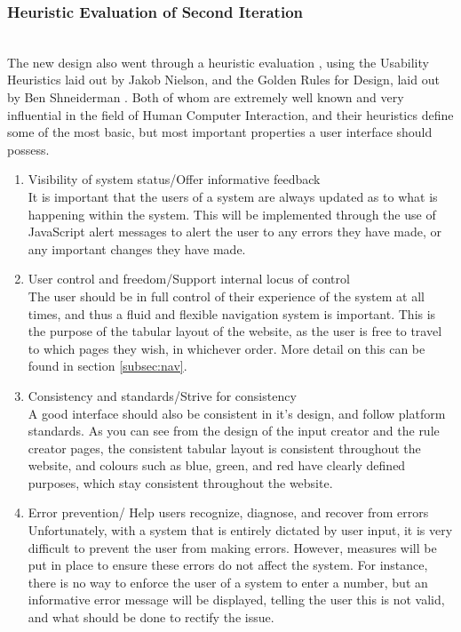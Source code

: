 \subsubsection{Heuristic Evaluation of Second Iteration}\ \\
The new design also went through a heuristic evaluation \cite{nielsen1990heuristic}, using the Usability Heuristics laid out by Jakob Nielson, and the Golden Rules for Design, laid out by Ben Shneiderman \cite{shneiderman2005designing}. Both of whom are extremely well known and very influential in the field of Human Computer Interaction, and their heuristics define some of the most basic, but most important properties a user interface should possess. 

\begin{enumerate}
\item Visibility of system status/Offer informative feedback\\
It is important that the users of a system are always updated as to what is happening within the system. This will be implemented through the use of JavaScript alert messages to alert the user to any errors they have made, or any important changes they have made.
\item User control and freedom/Support internal locus of control\\
The user should be in full control of their experience of the system at all times, and thus a fluid and flexible navigation system is important. This is the purpose of the tabular layout of the website, as the user is free to travel to which pages they wish, in whichever order. More detail on this can be found in section \ref{subsec:nav}.
\item Consistency and standards/Strive for consistency\\
A good interface should also be consistent in it's design, and follow platform standards. As you can see from the design of the input creator and the rule creator pages, the consistent tabular layout is consistent throughout the website, and colours such as blue, green, and red have clearly defined purposes, which stay consistent throughout the website.
\item Error prevention/ Help users recognize, diagnose, and recover from errors\\
Unfortunately, with a system that is entirely dictated by user input, it is very difficult to prevent the user from making errors. However, measures will be put in place to ensure these errors do not affect the system. For instance, there is no way to enforce the user of a system to enter a number, but an informative error message will be displayed, telling the user this is not valid, and what should be done to rectify the issue.

\end{enumerate}
